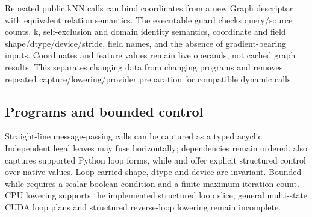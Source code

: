 Repeated public kNN calls can bind coordinates from a new Graph descriptor with
equivalent relation semantics. The executable guard checks query/source counts,
k, self-exclusion and domain identity semantics, coordinate and field
shape/dtype/device/stride, field names, and the absence of gradient-bearing
inputs. Coordinates and feature values remain live operands, not cached graph
results. This separates changing data from changing programs and removes
repeated capture/lowering/provider preparation for compatible dynamic calls.

\subsection{Programs and bounded control}
Straight-line message-passing calls can be captured as a typed acyclic
. Independent legal leaves may fuse horizontally; dependencies
remain ordered.  also captures supported Python loop forms, while
 and  offer explicit structured control over native
values. Loop-carried shape, dtype and device are invariant. Bounded while requires
a scalar boolean condition and a finite maximum iteration count. CPU lowering
supports the implemented structured loop slice; general multi-state CUDA loop
plans and structured reverse-loop lowering remain incomplete.
\FloatBarrier
